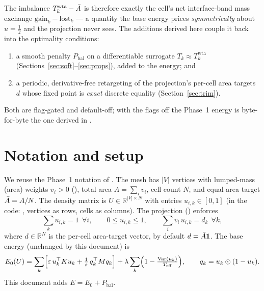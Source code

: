 \documentclass[11pt,a4paper]{article}
\begin{document}
The imbalance $T^{\mathrm{wta}}_k-\bar{A}$ is therefore exactly the cell's net
interface-band mass exchange $\mathrm{gain}_k-\mathrm{lost}_k$ — a quantity
the base energy prices \emph{symmetrically} about $u=\tfrac12$ and the
projection never sees. The additions derived here couple it back into the
optimality conditions:
\begin{enumerate}[itemsep=1pt]
  \item a smooth penalty $P_{\mathrm{bal}}$ on a differentiable surrogate
        $T_k \approx T_k^{\mathrm{wta}}$ (Sections~\ref{sec:soft}--\ref{sec:props}),
        added to the energy; and
  \item a periodic, derivative-free retargeting of the projection's per-cell
        area targets $d$ whose fixed point is \emph{exact} discrete equality
        (Section~\ref{sec:trim}).
\end{enumerate}
Both are flag-gated and default-off; with the flags off the Phase~1 energy is
byte-for-byte the one derived in
.

\section{Notation and setup}
\label{sec:notation}

We reuse the Phase~1 notation of
. The mesh has $|V|$
vertices with lumped-mass (area) weights $v_i>0$
(), total area $A=\sum_i v_i$, cell count $N$, and equal-area
target $\bar{A} = A/N$. The density matrix is $U\in\mathbb{R}^{|V|\times N}$
with entries $u_{i,k}\in[0,1]$ (in the code: ,
vertices as rows, cells as columns). The projection
() enforces
\begin{equation}
  \sum_k u_{i,k} = 1 \ \ \forall i,
  \qquad
  0 \le u_{i,k} \le 1,
  \qquad
  \sum_i v_i\, u_{i,k} = d_k \ \ \forall k,
  \label{eq:constraints}
\end{equation}
where $d\in\mathbb{R}^N$ is the per-cell area-target vector, by default
$d = \bar{A}\mathbf 1$. The base energy (unchanged by this document) is
\begin{equation}
  E_0(U) = \sum_k \Bigl[\varepsilon\, u_k^\top K u_k
        + \tfrac1\varepsilon\, q_k^\top M q_k\Bigr]
        + \lambda \sum_k \Bigl(1 - \tfrac{\operatorname{Var}(u_k)}{T_{\mathrm{eff}}}\Bigr),
  \qquad q_k = u_k\odot(1-u_k).
  \label{eq:E0}
\end{equation}
This document adds $E = E_0 + P_{\mathrm{bal}}$.
\end{document}
